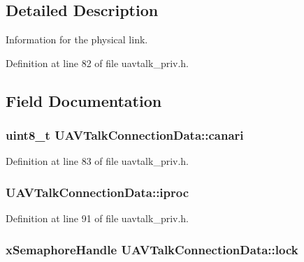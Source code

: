 \subsection{\-Detailed \-Description}
\-Information for the physical link. 

\-Definition at line 82 of file uavtalk\-\_\-priv.\-h.



\subsection{\-Field \-Documentation}
\hypertarget{struct_u_a_v_talk_connection_data_a7fcfd5eef5b464048953ae8a62995142}{
\subsubsection[{canari}]{\setlength{\rightskip}{0pt plus 5cm}uint8\-\_\-t {\bf \-U\-A\-V\-Talk\-Connection\-Data\-::canari}}}\label{struct_u_a_v_talk_connection_data_a7fcfd5eef5b464048953ae8a62995142}


\-Definition at line 83 of file uavtalk\-\_\-priv.\-h.

\hypertarget{struct_u_a_v_talk_connection_data_aa032a7b051df7fcc53accec1d7ba602b}{
\subsubsection[{iproc}]{ {\bf \-U\-A\-V\-Talk\-Connection\-Data\-::iproc}}}\label{struct_u_a_v_talk_connection_data_aa032a7b051df7fcc53accec1d7ba602b}


\-Definition at line 91 of file uavtalk\-\_\-priv.\-h.

\hypertarget{struct_u_a_v_talk_connection_data_ad1614e80f39f9dfbe062a5cb7375387b}{
\subsubsection[{lock}]{\setlength{\rightskip}{0pt plus 5cm}x\-Semaphore\-Handle {\bf \-U\-A\-V\-Talk\-Connection\-Data\-::lock}}}\label{struct_u_a_v_talk_connection_data_ad1614e80f39f9dfbe062a5cb7375387b}



